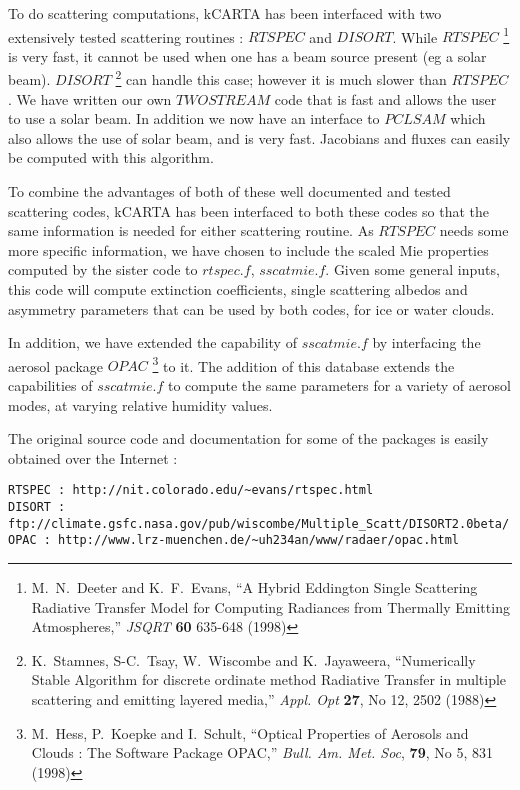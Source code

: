 \documentclass[12pt]{article}
\newcommand{\kc}{\textsf{kCARTA}\xspace}
\begin{document}
To do scattering computations, \kc has been interfaced with two extensively
tested scattering routines : $RTSPEC$ and $DISORT$. While $RTSPEC$ 
\footnote{ M.~N.~Deeter and K.~F.~Evans, ``A Hybrid Eddington Single 
Scattering Radiative Transfer Model for Computing Radiances from Thermally 
Emitting Atmospheres,'' {\em JSQRT} {\bf 60} 635-648 (1998)}
is very fast, it cannot be used when one has a beam source present 
(eg a solar beam). $DISORT$ 
\footnote{ K.~Stamnes, S-C.~Tsay, W.~Wiscombe and K.~Jayaweera, ``Numerically
Stable Algorithm for discrete ordinate method Radiative Transfer in multiple
scattering and emitting layered media,'' {\em Appl. Opt} {\bf 27}, No 12, 2502
(1988)} can handle this case; however it is much slower than $RTSPEC$. We have
written our own $TWOSTREAM$ code that is fast and allows the user to use a
solar beam. In addition we now have an interface to $PCLSAM$ which also 
allows the use of solar beam, and is very fast. Jacobians and fluxes can easily
be computed with this algorithm.

To combine the advantages of both of these well documented and tested 
scattering codes, \kc has been interfaced to both these codes so that the 
same information is needed for either scattering routine. As $RTSPEC$ needs
some more specific information, we have chosen to include the scaled Mie
properties computed by the sister code to $rtspec.f$, $sscatmie.f$. Given
some general inputs, this code will compute extinction coefficients, single 
scattering albedos and asymmetry parameters that can be used by both codes,
for ice or water clouds.

In addition, we have extended the capability of $sscatmie.f$ by interfacing
the aerosol package $OPAC$ 
\footnote{M.~Hess, P.~Koepke and I.~Schult, ``Optical Properties of Aerosols 
and Clouds : The Software Package OPAC,'' {\em Bull. Am. Met. Soc}, {\bf 79}, 
No 5, 831 (1998)} to it. The addition of this database extends the 
capabilities of $sscatmie.f$ to compute the same parameters 
for a variety of aerosol modes, at varying relative humidity values.

The original source code and documentation for some of the packages is 
easily obtained over the Internet : \\
\begin{verbatim}
RTSPEC : http://nit.colorado.edu/~evans/rtspec.html
DISORT : ftp://climate.gsfc.nasa.gov/pub/wiscombe/Multiple_Scatt/DISORT2.0beta/
OPAC : http://www.lrz-muenchen.de/~uh234an/www/radaer/opac.html
\end{verbatim}
\end{document}
